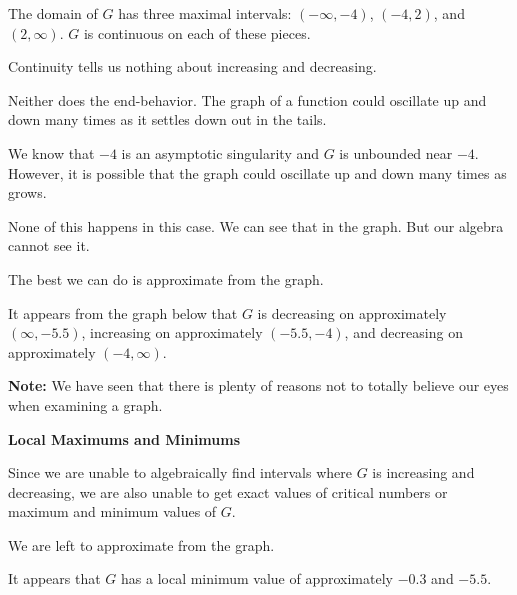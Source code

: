 \documentclass{ximera}
\begin{document}
\begin{explanation}



The domain of $G$ has three maximal intervals: $(-\infty,-4)$, $(-4,2)$, and $(2,\infty)$.  $G$ is continuous on each of these pieces.



Continuity tells us nothing about increasing and decreasing.


Neither does the end-behavior. The graph of a function could oscillate up and down many times as it settles down out in the tails.


We know that $-4$ is an asymptotic singularity and $G$ is unbounded near $-4$.  However, it is possible that the graph could oscillate up and down many times as grows.


None of this happens in this case.  We can see that in the graph.  But our algebra cannot see it.



The best we can do is approximate from the graph.

It appears from the graph below that $G$ is decreasing on approximately $(\infty, -5.5)$, increasing on approximately $(-5.5, -4)$, and decreasing on approximately $(-4, \infty)$.

\textbf{Note:} We have seen that there is plenty of reasons not to totally believe our eyes when examining a graph.



\end{explanation}
















\textbf{\textcolor{purple!85!blue}{Local Maximums and Minimums}} 

\begin{explanation}


Since we are unable to algebraically find intervals where $G$ is increasing and decreasing, we are also unable to get exact values of critical numbers or maximum and minimum values of $G$.


We are left to approximate from the graph.

It appears that $G$ has a local minimum value of approximately $-0.3$ and $-5.5$.


\end{explanation}
\end{document}
